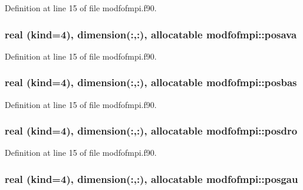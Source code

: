 Definition at line 15 of file modfofmpi.\+f90.

\subsubsection[{\texorpdfstring{posava}{posava}}]{\setlength{\rightskip}{0pt plus 5cm}real (kind=4), dimension(\+:,\+:), allocatable modfofmpi\+::posava}\hypertarget{namespacemodfofmpi_a91f992ee7447a7fb3c5430233f3f39ab}{}\label{namespacemodfofmpi_a91f992ee7447a7fb3c5430233f3f39ab}


Definition at line 15 of file modfofmpi.\+f90.

\subsubsection[{\texorpdfstring{posbas}{posbas}}]{\setlength{\rightskip}{0pt plus 5cm}real (kind=4), dimension(\+:,\+:), allocatable modfofmpi\+::posbas}\hypertarget{namespacemodfofmpi_abd8afe0852ff1d0298955d285cb4f001}{}\label{namespacemodfofmpi_abd8afe0852ff1d0298955d285cb4f001}


Definition at line 15 of file modfofmpi.\+f90.

\subsubsection[{\texorpdfstring{posdro}{posdro}}]{\setlength{\rightskip}{0pt plus 5cm}real (kind=4), dimension(\+:,\+:), allocatable modfofmpi\+::posdro}\hypertarget{namespacemodfofmpi_a1ca3754d2490a28a6596589818c19aba}{}\label{namespacemodfofmpi_a1ca3754d2490a28a6596589818c19aba}


Definition at line 15 of file modfofmpi.\+f90.

\subsubsection[{\texorpdfstring{posgau}{posgau}}]{\setlength{\rightskip}{0pt plus 5cm}real (kind=4), dimension(\+:,\+:), allocatable modfofmpi\+::posgau}\hypertarget{namespacemodfofmpi_a420a314f84492aec68a773c09730981d}{}\label{namespacemodfofmpi_a420a314f84492aec68a773c09730981d}



